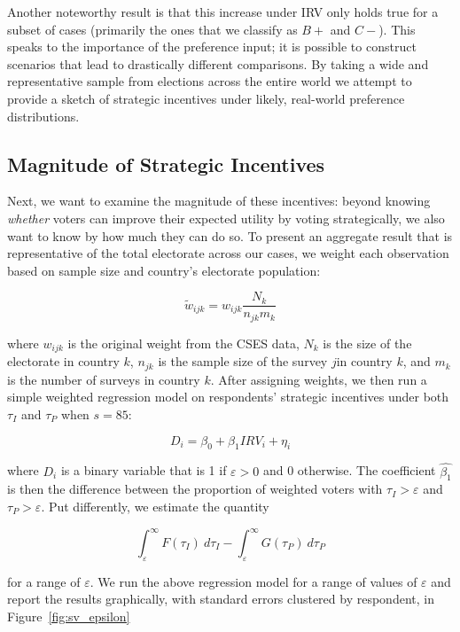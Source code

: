 \documentclass[12pt, letter]{article}
\begin{document}
Another noteworthy result is that this increase under IRV only holds true for a subset of cases (primarily the ones that we classify as $B+$ and $C-$). This speaks to the importance of the preference input; it is possible to construct scenarios that lead to drastically different comparisons. By taking a wide and representative sample from elections across the entire world we attempt to provide a sketch of strategic incentives under likely, real-world preference distributions.

\subsection{Magnitude of Strategic Incentives}

Next, we want to examine the magnitude of these incentives: beyond knowing \emph{whether} voters can improve their expected utility by voting strategically, we also want to know by how much they can do so. To present an aggregate result that is representative of the total electorate across our cases, we weight each observation based on sample size and country's electorate population:

\begin{equation*}
	\tilde{w}_{ijk} = w_{ijk} \frac{N_k}{ n_{jk} m_{k} } 
\end{equation*}

where $w_{ijk}$ is the original weight from the CSES data, $N_k$ is the size of the electorate in country $k$, $n_{jk}$ is the sample size of the survey $j$in country $k$, and $m_k$ is the number of surveys in country $k$. After assigning weights, we then run a simple weighted regression model on respondents' strategic incentives under both $\tau_I$ and $\tau_P$ when $s = 85$:

\begin{equation}
	D_i = \beta_0 + \beta_1 IRV_i + \eta_i
\end{equation}

where $D_i$ is a binary variable that is 1 if $\varepsilon > 0$ and 0 otherwise. The coefficient $\hat{\beta_1}$ is then the difference between the proportion of weighted voters with $\tau_{I} > \varepsilon$ and $\tau_{P} > \varepsilon$. Put differently, we estimate the quantity

\begin{equation*}
	\int_\varepsilon^\infty F(\tau_I) \ d\tau_I - \int_\varepsilon^\infty G(\tau_P) \ d\tau_P
\end{equation*}

for a range of $\varepsilon$. We run the above regression model for a range of values of $\varepsilon$ and report the results graphically, with standard errors clustered by respondent, in Figure~\ref{fig:sv_epsilon}
\end{document}
